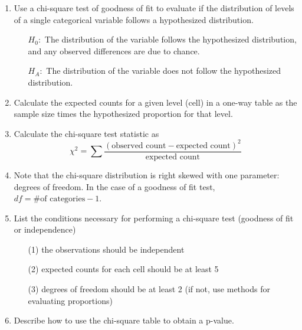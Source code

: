 \documentclass[11pt]{article}
\begin{document}
\begin{enumerate}[resume]
\renewcommand\labelenumi{\textcolor{light}{\textbf{LO \theenumi.}}}

\item Use a chi-square test of goodness of fit to evaluate if the distribution of levels of a single categorical variable follows a hypothesized distribution.
\begin{itemize}
\item[] $H_0:$ The distribution of the variable follows the hypothesized distribution, and any observed differences are due to chance.
\item[] $H_A:$ The distribution of the variable does not follow the hypothesized distribution.
\end{itemize}

\item Calculate the expected counts for a given level (cell) in a one-way table as the sample size times the hypothesized proportion for that level.

\item Calculate the chi-square test statistic as 
\[ \chi^2 = \sum{\frac{(\text{observed count} - \text{expected count})^2}{\text{expected count}}}\]

\item Note that the chi-square distribution is right skewed with one parameter: degrees of freedom. In the case of a goodness of fit test, $df = \# \text{of categories} - 1$.

\item List the conditions necessary for performing a chi-square test (goodness of fit or independence)
\begin{enumerate}
\item[(1)] the observations should be independent
\item[(2)] expected counts for each cell should be at least 5
\item[(3)] degrees of freedom should be at least 2 (if not, use methods for evaluating proportions)
\end{enumerate}

\item Describe how to use the chi-square table to obtain a p-value.

\end{enumerate}
\end{document}
